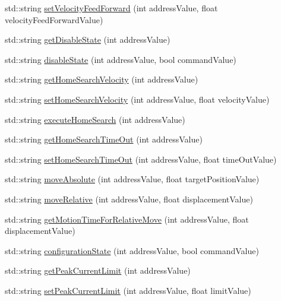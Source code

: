 \begin{DoxyCompactItemize}
\item 
std\+::string \hyperlink{namespaceconex_a5bcb38c3b971ccf0f2c03794ae16798c}{set\+Velocity\+Feed\+Forward} (int address\+Value, float velocity\+Feed\+Forward\+Value)
\item 
std\+::string \hyperlink{namespaceconex_aa030f5f6f8e7d9de0c53bc783fd3b40a}{get\+Disable\+State} (int address\+Value)
\item 
std\+::string \hyperlink{namespaceconex_a379241e6a2dafd2c5378ff9029a2afbb}{disable\+State} (int address\+Value, bool command\+Value)
\item 
std\+::string \hyperlink{namespaceconex_a9bf3d6adb4fd4d48f95b2c27169ef773}{get\+Home\+Search\+Velocity} (int address\+Value)
\item 
std\+::string \hyperlink{namespaceconex_ae0d284374b70f666fa8cad9bb3c81aa4}{set\+Home\+Search\+Velocity} (int address\+Value, float velocity\+Value)
\item 
std\+::string \hyperlink{namespaceconex_a31e52a12a8f66df0c10a49931f7fce47}{execute\+Home\+Search} (int address\+Value)
\item 
std\+::string \hyperlink{namespaceconex_a5652c22cdfb236799111449461eb88f5}{get\+Home\+Search\+Time\+Out} (int address\+Value)
\item 
std\+::string \hyperlink{namespaceconex_a55f14dbf89cbe71b6d0934eef1a97d1b}{set\+Home\+Search\+Time\+Out} (int address\+Value, float time\+Out\+Value)
\item 
std\+::string \hyperlink{namespaceconex_ae52a8731032ef6b65b942aa0573d81cc}{move\+Absolute} (int address\+Value, float target\+Position\+Value)
\item 
std\+::string \hyperlink{namespaceconex_a6728914e77941e2fb4483b6721785ffb}{move\+Relative} (int address\+Value, float displacement\+Value)
\item 
std\+::string \hyperlink{namespaceconex_aab2d3f712ba59df6e3001ea727d3c514}{get\+Motion\+Time\+For\+Relative\+Move} (int address\+Value, float displacement\+Value)
\item 
std\+::string \hyperlink{namespaceconex_aa9f0011a56576d7e9382d9d7d211e946}{configuration\+State} (int address\+Value, bool command\+Value)
\item 
std\+::string \hyperlink{namespaceconex_a4d69b5890ba99a072d3a3ef67f26047a}{get\+Peak\+Current\+Limit} (int address\+Value)
\item 
std\+::string \hyperlink{namespaceconex_ad4e9c3f1429c4d356c4814c816b1ce42}{set\+Peak\+Current\+Limit} (int address\+Value, float limit\+Value)
\item 

\end{DoxyCompactItemize}
